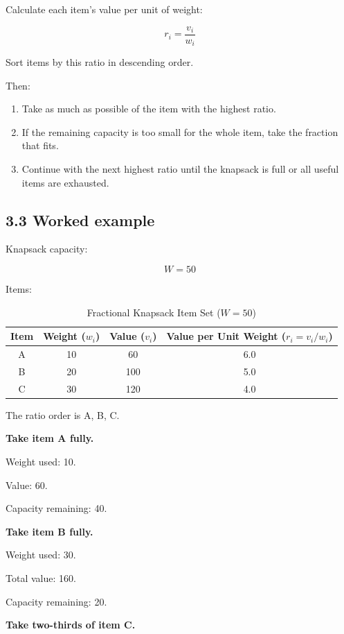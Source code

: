 Calculate each item's value per unit of weight:


\[
\boxed{r_i=\frac{v_i}{w_i}}
\]


Sort items by this ratio in descending order.

Then:

\begin{enumerate}
    \item Take as much as possible of the item with the highest ratio.
    \item If the remaining capacity is too small for the whole item, take the fraction that fits.
    \item Continue with the next highest ratio until the knapsack is full or all useful items are exhausted.
\end{enumerate}

\subsection{3.3 Worked example}

Knapsack capacity:


\[
W=50
\]


Items:

\begin{table}[htbp]
\centering
\caption{Fractional Knapsack Item Set ($W = 50$)}
\label{tab:fractional_knapsack_data}
\begin{tabular}{cccc}
\toprule
\textbf{Item} & \textbf{Weight ($w_i$)} & \textbf{Value ($v_i$)} & \textbf{Value per Unit Weight ($r_i = v_i/w_i$)} \\
\midrule
A & 10 & 60 & 6.0 \\
B & 20 & 100 & 5.0 \\
C & 30 & 120 & 4.0 \\
\bottomrule
\end{tabular}
\end{table}

The ratio order is A, B, C.

\textbf{Take item A fully.}

Weight used: 10.

Value: 60.

Capacity remaining: 40.

\textbf{Take item B fully.}

Weight used: 30.

Total value: 160.

Capacity remaining: 20.

\textbf{Take two-thirds of item C.}

